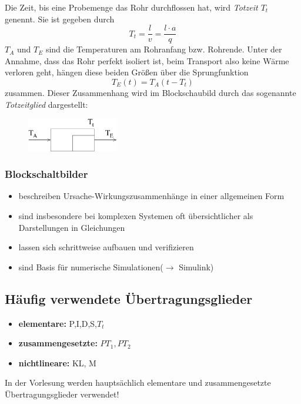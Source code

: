 \message{ !name(Mitschrieb_SysRegel.tex)}\documentclass[12pt,a4paper,ngerman]{scrartcl}
\begin{document}
Die Zeit, bis eine Probemenge das Rohr durchflossen hat, wird \emph{Totzeit $T_t$} genennt. Sie ist gegeben durch
\begin{equation*}
  T_t=\frac{l}{v}=\frac{l \cdot a}{q}
\end{equation*}
$T_A$ und $T_E$ sind die Temperaturen am Rohranfang bzw. Rohrende. Unter der Annahme, dass das Rohr perfekt isoliert ist, beim Transport also keine Wärme verloren geht, hängen diese beiden Größen über die Sprungfunktion
\begin{equation*}
  T_E(t)=T_A(t-T_t)
\end{equation*}
zusammen. Dieser Zusammenhang wird im Blockschaubild durch das sogenannte \emph{Totzeitglied} dargestellt:
\begin{figure}[H]
  \includegraphics[width=4cm]{sysregel_tglied}
\end{figure}
\fancyhead{}
\fancyhead[LO,LE]{\leftmark}
\subsubsection*{Blockschaltbilder}
\begin{itemize}
\item beschreiben Ursache-Wirkungszusammenhänge in einer allgemeinen Form
\item sind insbesondere bei komplexen Systemen oft übersichtlicher als Darstellungen in Gleichungen
\item lassen sich schrittweise aufbauen und verifizieren
\item sind Basis für numerische Simulationen($\rightarrow$ Simulink)
\end{itemize}

\subsection{Häufig verwendete Übertragungsglieder}

\begin{itemize}
\item \textbf{elementare: }P,I,D,S,$T_t$
\item \textbf{zusammengesetzte: } $PT_1, PT_2$
\item \textbf{nichtlineare: } KL, M
\end{itemize}
In der Vorlesung werden hauptsächlich elementare und zusammengesetzte Übertragungsglieder verwendet!
\end{document}
